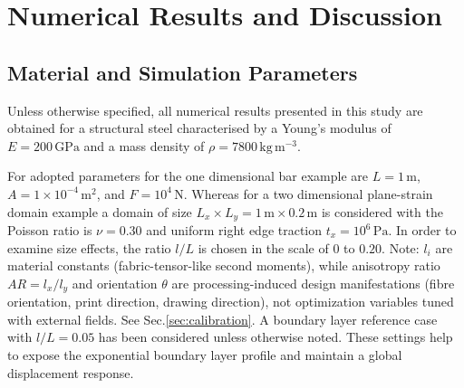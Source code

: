 \documentclass[final,3p,times,fleqn]{elsarticle}
\newcommand{\rev}[1]{\textcolor{revcolor}{#1}}
\begin{document}
\section{Numerical Results and Discussion}
\label{sec:numerical_results}


\subsection{Material and Simulation Parameters}
\label{sec:materials}

Unless otherwise specified, all numerical results presented in this
study are obtained for a structural steel characterised by a Young's
modulus of $E = 200\,\mathrm{GPa}$ and a mass density of
$\rho = 7800\,\mathrm{kg\,m^{-3}}$.

For adopted parameters for the one dimensional bar example are $L = 1\,\mathrm{m}$, $A = 1\times10^{-4}\,\mathrm{m^{2}}$, and
$F = 10^{4}\,\mathrm{N}$. Whereas for a two dimensional plane-strain domain example a domain of size $L_{x}\times L_{y} = 1\,\mathrm{m}\times 0.2\,\mathrm{m}$ is considered with the Poisson
ratio is $\nu = 0.30$ and uniform right edge traction 
$t_{x} = 10^{6}\,\mathrm{Pa}$. In order to examine size effects, the ratio $l/L$ is chosen in the scale of $0$ to $0.20$. \rev{Note: $l_i$ are material constants (fabric-tensor-like second moments), while anisotropy ratio $AR=l_x/l_y$ and orientation $\theta$ are processing-induced design manifestations (fibre orientation, print direction, drawing direction), not optimization variables tuned with external fields. See Sec.\ref{sec:calibration}.} A boundary layer reference case with $l/L=0.05$ has been considered unless otherwise noted. These settings help to expose the exponential boundary layer profile  and maintain a global displacement response. 



\end{document}
